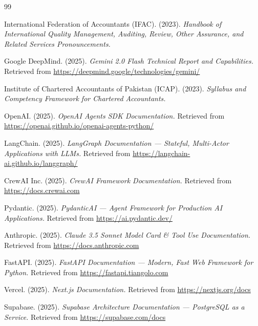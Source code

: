 \documentclass[12pt,a4paper]{article}
\begin{document}
\newpage
\begin{thebibliography}{99}

International Federation of Accountants (IFAC). (2023).
\textit{Handbook of International Quality Management, Auditing, Review, Other Assurance, and Related Services Pronouncements.}

Google DeepMind. (2025).
\textit{Gemini 2.0 Flash Technical Report and Capabilities.}
Retrieved from \url{https://deepmind.google/technologies/gemini/}

Institute of Chartered Accountants of Pakistan (ICAP). (2023).
\textit{Syllabus and Competency Framework for Chartered Accountants.}

OpenAI. (2025).
\textit{OpenAI Agents SDK Documentation.}
Retrieved from \url{https://openai.github.io/openai-agents-python/}

LangChain. (2025).
\textit{LangGraph Documentation — Stateful, Multi-Actor Applications with LLMs.}
Retrieved from \url{https://langchain-ai.github.io/langgraph/}

CrewAI Inc. (2025).
\textit{CrewAI Framework Documentation.}
Retrieved from \url{https://docs.crewai.com}

Pydantic. (2025).
\textit{PydanticAI — Agent Framework for Production AI Applications.}
Retrieved from \url{https://ai.pydantic.dev/}

Anthropic. (2025).
\textit{Claude 3.5 Sonnet Model Card \& Tool Use Documentation.}
Retrieved from \url{https://docs.anthropic.com}

FastAPI. (2025).
\textit{FastAPI Documentation — Modern, Fast Web Framework for Python.}
Retrieved from \url{https://fastapi.tiangolo.com}

Vercel. (2025).
\textit{Next.js Documentation.}
Retrieved from \url{https://nextjs.org/docs}

Supabase. (2025).
\textit{Supabase Architecture Documentation — PostgreSQL as a Service.}
Retrieved from \url{https://supabase.com/docs}

\end{thebibliography}
\end{document}
